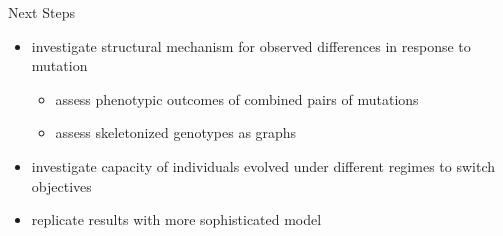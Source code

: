 \begin{block}{Next Steps}
\vspace{-1ex}
{\small
\begin{itemize}
\item investigate structural mechanism for observed differences in response to mutation 
\begin{itemize}
\item assess phenotypic outcomes of combined pairs of mutations  
\item assess skeletonized genotypes as graphs
\end{itemize}
\item investigate capacity of individuals evolved under different regimes to switch objectives
\item replicate results with more sophisticated model
\end{itemize}
}
\vspace{-1ex}
\end{block}

